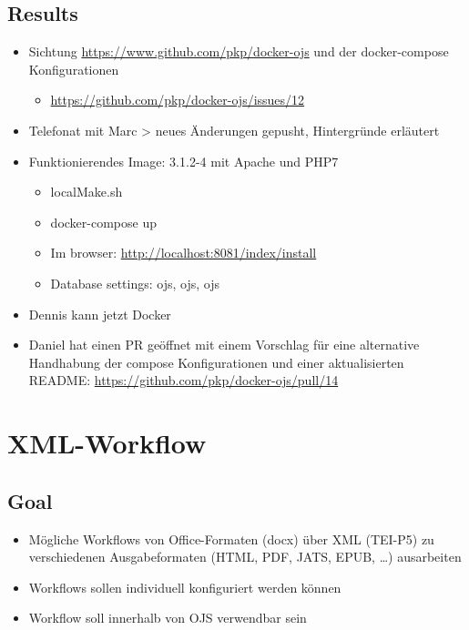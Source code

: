\documentclass{article}
\begin{document}
\subsection[{Results}]{\label{ijros8fzbxm}Results}
\begin{itemize}
\item Sichtung \url{https://www.github.com/pkp/docker-ojs} und der docker-compose Konfigurationen

\begin{itemize}
\item \url{https://github.com/pkp/docker-ojs/issues/12}
\end{itemize} 
\item Telefonat mit Marc > neues Änderungen gepusht, Hintergründe erläutert
\item Funktionierendes Image: 3.1.2-4 mit Apache und PHP7 
\begin{itemize}
\item localMake.sh
\item docker-compose up
\item Im browser: \url{http://localhost:8081/index/install}
\item Database settings: ojs, ojs, ojs
\end{itemize} 
\item Dennis kann jetzt Docker
\item Daniel hat einen PR geöffnet mit einem Vorschlag für eine alternative Handhabung der compose Konfigurationen und einer aktualisierten README: \url{https://github.com/pkp/docker-ojs/pull/14}
\end{itemize} 
 
\section{XML-Workflow}

\author{Adrian Pachzelt, Klaus Thoden, Marianna Mühlhölzer, Hanna Varachkina, Ronald Steffen, Matthias Flasko, August H. Leugers-Scherzberg, Maximilian Plich}
\subsection[{Goal}]{\label{e5qdlbvq435o}Goal}
\begin{itemize}
\item Mögliche Workflows von Office-Formaten (docx) über XML (TEI-P5) zu verschiedenen Ausgabeformaten (HTML, PDF, JATS, EPUB, …) ausarbeiten
\item Workflows sollen individuell konfiguriert werden können
\item Workflow soll innerhalb von OJS verwendbar sein
\end{itemize} 
\end{document}
